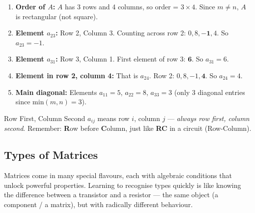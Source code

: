 \documentclass[12pt,a4paper]{article}
\begin{document}
\begin{enumerate}[label=(\alph*)]
  \item \textbf{Order of $A$:} $A$ has 3 rows and 4 columns, so order = $3 \times 4$. Since $m \neq n$, $A$ is rectangular (not square).
  \item \textbf{Element $a_{23}$:} Row 2, Column 3. Counting across row 2: $0, 8, \mathbf{-1}, 4$. So $a_{23} = -1$.
  \item \textbf{Element $a_{31}$:} Row 3, Column 1. First element of row 3: $\mathbf{6}$. So $a_{31} = 6$.
  \item \textbf{Element in row 2, column 4:} That is $a_{24}$. Row 2: $0, 8, -1, \mathbf{4}$. So $a_{24} = 4$.
  \item \textbf{Main diagonal:} Elements $a_{11} = 5$, $a_{22} = 8$, $a_{33} = 3$ (only 3 diagonal entries since min$(m,n) = 3$).
\end{enumerate}

\begin{learnbox}{Row First, Column Second}
$a_{ij}$ means row $i$, column $j$ --- \emph{always row first, column second}. Remember: \textbf{R}ow before \textbf{C}olumn, just like \textbf{RC} in a circuit (Row-Column).
\end{learnbox}

\subsection{Types of Matrices}

Matrices come in many special flavours, each with algebraic conditions that unlock powerful properties. Learning to recognise types quickly is like knowing the difference between a transistor and a resistor --- the same object (a component / a matrix), but with radically different behaviour.
\end{document}
